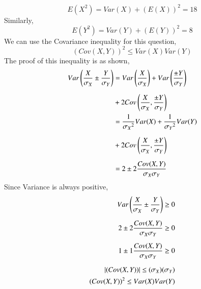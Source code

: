 \begin{equation}
    E(X^2) = Var(X)+(E(X))^2 = 18
\end{equation}
Similarly,
\begin{equation}
    E(Y^2) = Var(Y)+(E(Y))^2 = 8
\end{equation}
We can use the Covariance inequality for this question,
\begin{equation}
  ({Cov(X,Y)})^2\leq Var(X)Var(Y)
\end{equation}
The proof of this inequality is as shown,
\begin{align}
\nonumber    Var\left(\dfrac{X}{\sigma_X}\pm\dfrac{Y}{\sigma_Y}\right) &= Var\left(\dfrac{X}{\sigma_X}\right)+Var\left(\dfrac{\pm Y}{\sigma_Y}\right)\\[6pt]
    &+2Cov\left(\dfrac{X}{\sigma_X},\dfrac{\pm Y}{\sigma_Y}\right)\\
\nonumber    &=\dfrac{1}{{\sigma_X}^2}Var(X)+\dfrac{1}{{\sigma_Y}^2}Var(Y)\\[6pt]
    &+2 Cov\left(\dfrac{X}{\sigma_X},\dfrac{\pm Y}{\sigma_Y}\right)\\[6pt]
    &=2\pm2\dfrac{Cov(X,Y)}{{\sigma_X}{\sigma_Y}}
\end{align}
Since Variance is always positive,
\begin{align}
    Var\left(\dfrac{X}{\sigma_X}\pm\dfrac{Y}{\sigma_Y}\right)\geq 0
    \\[6pt]
    2\pm2\dfrac{Cov(X,Y)}{{\sigma_X}{\sigma_Y}} \geq 0
    \\[6pt]
    1\pm1\dfrac{Cov(X,Y)}{{\sigma_X}{\sigma_Y}}\geq 0
    \\[6pt]
    \left\vert({Cov(X,Y)})\right\vert\leq (\sigma_X)(\sigma_Y)
    \\
    ({Cov(X,Y)})^2\leq Var(X)Var(Y)
\end{align}

